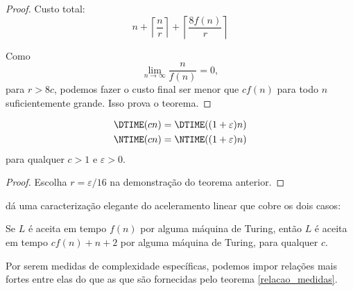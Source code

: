 \begin{proof}
    Custo total:
    \begin{equation*}
        n + \left\lceil \frac n r \right\rceil +
            \left\lceil \frac{8f(n)}{r} \right\rceil
    \end{equation*}

    Como
    \begin{equation*}
        \lim_{n \rightarrow \infty} \frac{n}{f(n)} = 0,
    \end{equation*}
    para $r > 8c$,
    podemos fazer o custo final
    ser menor que $cf(n)$ para todo $n$ suficientemente grande.
    Isso prova o teorema.
\end{proof}

\begin{theorem}
    \begin{align*}
        \DTIME(cn) &= \DTIME((1+\varepsilon)n) \\
        \NTIME(cn) &= \NTIME((1+\varepsilon)n)
    \end{align*}
    para qualquer $c > 1$ e $\varepsilon > 0$.
\end{theorem}

\begin{proof}
    Escolha $r = \varepsilon/16$ na demonstração do teorema anterior.
\end{proof}

dá uma caracterização elegante do aceleramento linear
que cobre os dois casos:
\begin{utheorem}
    Se $L$ é aceita em tempo $f(n)$ por alguma máquina de Turing,
    então $L$ é aceita em tempo $cf(n) + n + 2$ por alguma máquina de Turing,
    para qualquer $c$.
\end{utheorem}

Por serem medidas de complexidade específicas,
podemos impor relações mais fortes entre elas
do que as que são fornecidas pelo teorema \ref{relacao_medidas}.

